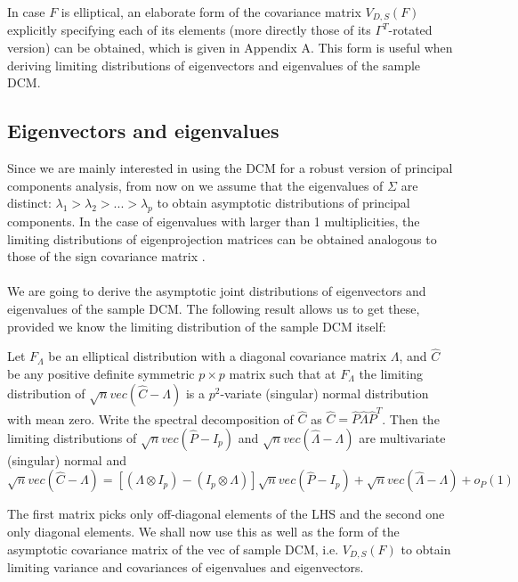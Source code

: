 \documentclass[fleqn,12pt]{article}
\begin{document}
In case $F$ is elliptical, an elaborate form of the covariance matrix $V_{D,S}(F)$ explicitly specifying each of its elements (more directly those of its $\Gamma^T$-rotated version) can be obtained, which is given in Appendix A. This form is useful when deriving limiting distributions of eigenvectors and eigenvalues of the sample DCM.

\subsection{Eigenvectors and eigenvalues} Since we are mainly interested in using the DCM for a robust version of principal components analysis, from now on we assume that the eigenvalues of $\Sigma$ are distinct: $\lambda_1 > \lambda_2 > ... > \lambda_p$ to obtain asymptotic distributions of principal components. In the case of eigenvalues with larger than 1 multiplicities, the limiting distributions of eigenprojection matrices can be obtained analogous to those of the sign covariance matrix \citep{magyar14}.

\paragraph{}We are going to derive the asymptotic joint distributions of eigenvectors and eigenvalues of the sample DCM. The following result allows us to get these, provided we know the limiting distribution of the sample DCM itself:

\begin{Theorem} \label{Theorem:decomp} \citep{taskinen12}
Let $F_\Lambda$ be an elliptical distribution with a diagonal covariance matrix $\Lambda$, and $\hat C$ be any positive definite symmetric $p \times p$ matrix such that at $F_\Lambda$ the limiting distribution of $\sqrt n vec(\hat C - \Lambda)$ is a $p^2$-variate (singular) normal distribution with mean zero. Write the spectral decomposition of $\hat C$ as $\hat C = \hat P \hat\Lambda \hat P^T$. Then the limiting distributions of $\sqrt n vec(\hat P - I_p)$ and $\sqrt n vec(\hat\Lambda - \Lambda)$ are multivariate (singular) normal and
\begin{equation} \label{equation:decompEq}
\sqrt n vec (\hat C - \Lambda)  = \left[ (\Lambda \otimes I_p) - (I_p \otimes \Lambda) \right] \sqrt n vec (\hat P - I_p) + \sqrt n vec (\hat\Lambda - \Lambda) + o_P(1)
\end{equation}
\end{Theorem}

The first matrix picks only off-diagonal elements of the LHS and the second one only diagonal elements. We shall now use this as well as the form of the asymptotic covariance matrix of the vec of sample DCM, i.e. $V_{D,S}(F)$ to obtain limiting variance and covariances of eigenvalues and eigenvectors.
\end{document}
